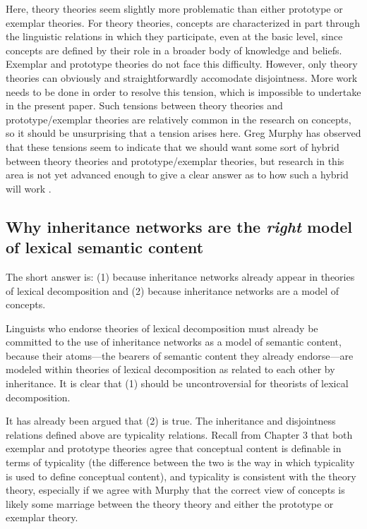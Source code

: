 Here, theory theories seem slightly more problematic than either prototype or exemplar theories. For theory theories, concepts are characterized in part through the linguistic relations in which they participate, even at the basic level, since concepts are defined by their role in a broader body of knowledge and beliefs. Exemplar and prototype theories do not face this difficulty. However, only theory theories can obviously and straightforwardly accomodate disjointness. More work needs to be done in order to resolve this tension, which is impossible to undertake in the present paper. Such tensions between theory theories and prototype/exemplar theories are relatively common in the research on concepts, so it should be unsurprising that a tension arises here. Greg Murphy has observed that these tensions seem to indicate that we should want some sort of hybrid between theory theories and prototype/exemplar theories, but research in this area is not yet advanced enough to give a clear answer as to how such a hybrid will work \cite{murphy_big_2002}.

\subsection{Why inheritance networks are the \emph{right} model of lexical semantic content}

The short answer is: (1) because inheritance networks already appear in theories of lexical decomposition and (2) because inheritance networks are a model of concepts.

Linguists who endorse theories of lexical decomposition must already be committed to the use of inheritance networks as a model of semantic content, because their atoms---the bearers of semantic content they already endorse---are modeled within theories of lexical decomposition as related to each other by inheritance. It is clear that (1) should be uncontroversial for theorists of lexical decomposition.

It has already been argued that (2) is true. The inheritance and disjointness relations defined above are typicality relations. Recall from Chapter 3 that both exemplar and prototype theories agree that conceptual content is definable in terms of typicality (the difference between the two is the way in which typicality is used to define conceptual content), and typicality is consistent with the theory theory, especially if we agree with Murphy \cite{murphy_big_2002} that the correct view of concepts is likely some marriage between the theory theory and either the prototype or exemplar theory.

